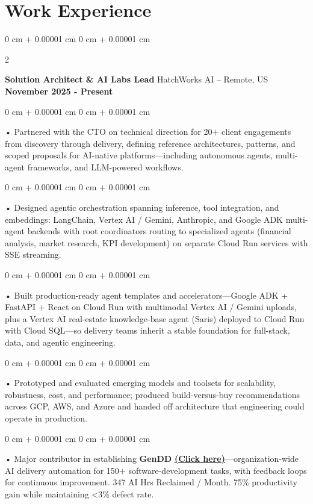\documentclass[10pt, letterpaper]{article}
\newenvironment{onecolentry}{
    \begin{adjustwidth}{
        0 cm + 0.00001 cm
    }{
        0 cm + 0.00001 cm
    }
}{
    \end{adjustwidth}
} %
\newenvironment{twocolentry}[2][]{
    \onecolentry
    \def\secondColumn{#2}
    \setcolumnwidth{\fill, 4.5 cm}
    \begin{paracol}{2}
}{
    \switchcolumn \raggedleft \secondColumn
    \end{paracol}
    \endonecolentry
} %
\begin{document}
    \vspace{0.5cm}
    \section{Work Experience}
        \vspace{0.1cm}

        \begin{twocolentry}{
            \textbf{November 2025 - Present}
        }
            \textbf{Solution Architect \& AI Labs Lead} HatchWorks AI -- Remote, US\end{twocolentry}

        \begin{onecolentry}
             • Partnered with the CTO on technical direction for 20+ client engagements from discovery through delivery, defining reference architectures, patterns, and scoped proposals for AI-native platforms---including autonomous agents, multi-agent frameworks, and LLM-powered workflows.
        \end{onecolentry}
        \begin{onecolentry}
             • Designed agentic orchestration spanning inference, tool integration, and embeddings: LangChain, Vertex AI / Gemini, Anthropic, and Google ADK multi-agent backends with root coordinators routing to specialized agents (financial analysis, market research, KPI development) on separate Cloud Run services with SSE streaming.
        \end{onecolentry}
        \begin{onecolentry}
             • Built production-ready agent templates and accelerators---Google ADK + FastAPI + React on Cloud Run with multimodal Vertex AI / Gemini uploads, plus a Vertex AI real-estate knowledge-base agent (Saris) deployed to Cloud Run with Cloud SQL---so delivery teams inherit a stable foundation for full-stack, data, and agentic engineering.
        \end{onecolentry}
        \begin{onecolentry}
             • Prototyped and evaluated emerging models and toolsets for scalability, robustness, cost, and performance; produced build-versus-buy recommendations across GCP, AWS, and Azure and handed off architecture that engineering could operate in production.
        \end{onecolentry}
        \begin{onecolentry}
             • Major contributor in establishing \textbf{GenDD} \href{https://hatchworks.com/generative-driven-development/}{\textbf{(Click here)}}---organization-wide AI delivery automation for 150+ software-development tasks, with feedback loops for continuous improvement. 347 AI Hrs Reclaimed / Month. 75\% productivity gain while maintaining {<}3\% defect rate.
        \end{onecolentry}
\end{document}
